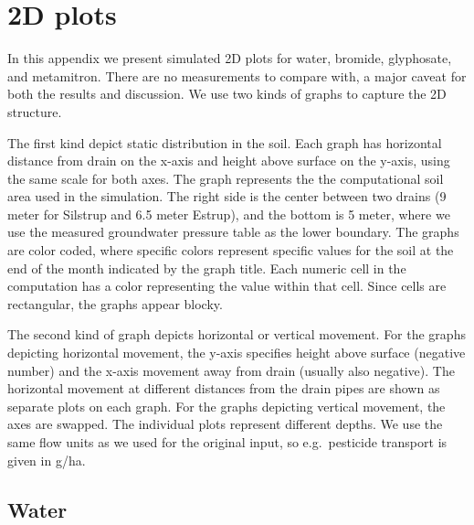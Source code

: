 \newcommand{\figsilstrupl}[1]{\figl\texttt{[image: fig/\#1]}}
\newcommand{\figsilstrup}[1]{\texttt{[image: fig/\#1]}}
\newcommand{\fluxtop}[1]{\figl\texttt{[image: fig/\#1]}}
\newcommand{\figestrupl}[1]{\hspace*{-1cm}\texttt{[image: fig/\#1]}}
\newcommand{\figestrup}[1]{\texttt{[image: fig/\#1]}}

\chapter{2D plots}
\label{app:plot-2d}

In this appendix we present simulated 2D plots for water, bromide,
glyphosate, and metamitron.  There are no measurements to compare
with, a major caveat for both the results and discussion.  We use two
kinds of graphs to capture the 2D structure.

The first kind depict static distribution in the soil.  Each graph has
horizontal distance from drain on the x-axis and height above surface
on the y-axis, using the same scale for both axes.  The graph
represents the the computational soil area used in the simulation.
The right side is the center between two drains (9 meter for Silstrup
and 6.5 meter Estrup), and the bottom is 5 meter, where we use the
measured groundwater pressure table as the lower boundary.  The graphs
are color coded, where specific colors represent specific values for
the soil at the end of the month indicated by the graph title.  Each
numeric cell in the computation has a color representing the value
within that cell.  Since cells are rectangular, the graphs appear
blocky.

The second kind of graph depicts horizontal or vertical movement.  For
the graphs depicting horizontal movement, the y-axis specifies height
above surface (negative number) and the x-axis movement away from
drain (usually also negative).  The horizontal movement at different
distances from the drain pipes are shown as separate plots on each
graph.  For the graphs depicting vertical movement, the axes are
swapped.  The individual plots represent different depths.  We use the
same flow units as we used for the original input, so e.g.\ pesticide
transport is given in g/ha.

\FloatBarrier
\section{Water}

